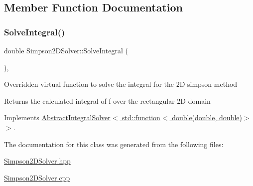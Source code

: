\subsection{Member Function Documentation}
\mbox{\label{class_simpson2_d_solver_a3fc19037fef83ad05381138d9f7da939}} 
\subsubsection{\texorpdfstring{Solve\+Integral()}{SolveIntegral()}}
{\footnotesize\ttfamily double Simpson2\+D\+Solver\+::\+Solve\+Integral (\begin{DoxyParamCaption}{ }\end{DoxyParamCaption})\hspace{0.3cm}{\ttfamily [override]}, {\ttfamily [virtual]}}

Overridden virtual function to solve the integral for the 2D simpson method \begin{DoxyReturn}{Returns}
the calculated integral of f over the rectangular 2D domain 
\end{DoxyReturn}


Implements \hyperlink{class_abstract_integral_solver_ad87cb44c5ef3122bc95be48f473ba399}{Abstract\+Integral\+Solver$<$ std\+::function$<$ double(double, double)$>$ $>$}.



The documentation for this class was generated from the following files\+:\begin{DoxyCompactItemize}
\item 
\hyperlink{_simpson2_d_solver_8hpp}{Simpson2\+D\+Solver.\+hpp}\item 
\hyperlink{_simpson2_d_solver_8cpp}{Simpson2\+D\+Solver.\+cpp}\end{DoxyCompactItemize}
